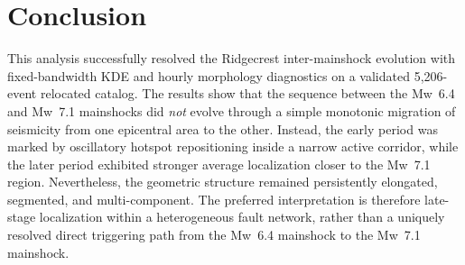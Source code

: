 \documentclass[11pt]{article}
\begin{document}
\section{Conclusion}
This analysis successfully resolved the Ridgecrest inter-mainshock evolution with fixed-bandwidth KDE and hourly morphology diagnostics on a validated 5,206-event relocated catalog. The results show that the sequence between the Mw~6.4 and Mw~7.1 mainshocks did \emph{not} evolve through a simple monotonic migration of seismicity from one epicentral area to the other. Instead, the early period was marked by oscillatory hotspot repositioning inside a narrow active corridor, while the later period exhibited stronger average localization closer to the Mw~7.1 region. Nevertheless, the geometric structure remained persistently elongated, segmented, and multi-component. The preferred interpretation is therefore late-stage localization within a heterogeneous fault network, rather than a uniquely resolved direct triggering path from the Mw~6.4 mainshock to the Mw~7.1 mainshock.
\end{document}
